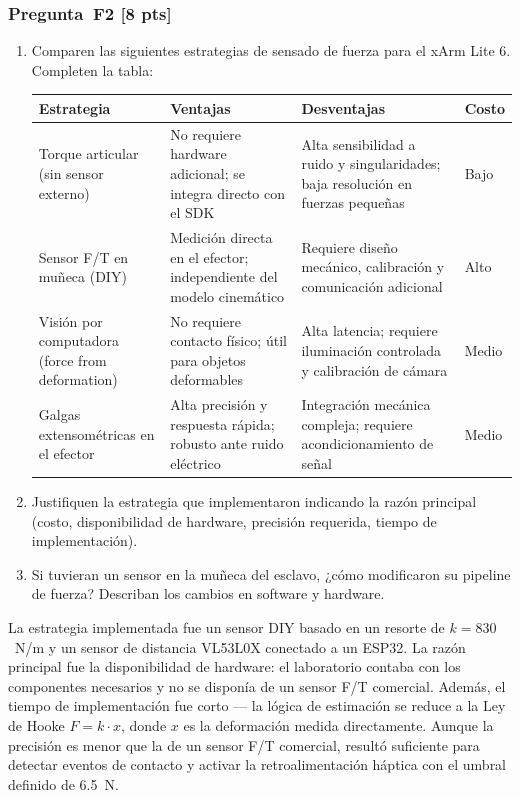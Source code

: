 \documentclass[journal,10pt,twoside]{IEEEtran}
\newcommand{\pts}[1]{\textbf{\color{tec_red}[#1 pts]}}
\begin{document}
\subsubsection*{Pregunta~F2 \pts{8}}
\begin{enumerate}[label=(\alph*)]
  \item Comparen las siguientes estrategias de sensado de fuerza
        para el xArm Lite 6. Completen la tabla:

\begin{center}
\small
\begin{tabular}{p{2.1cm}p{1.7cm}p{1.7cm}p{0.7cm}}
  \toprule
  \textbf{Estrategia} & \textbf{Ventajas} & \textbf{Desventajas} & \textbf{Costo} \\
  \midrule
  Torque articular (sin sensor externo)
    & No requiere hardware adicional; se integra directo con el SDK
    & Alta sensibilidad a ruido y singularidades; baja resolución en fuerzas pequeñas
    & Bajo \\
  Sensor F/T en muñeca (DIY)
    & Medición directa en el efector; independiente del modelo cinemático
    & Requiere diseño mecánico, calibración y comunicación adicional
    & Alto \\
  Visión por computadora (force from deformation)
    & No requiere contacto físico; útil para objetos deformables
    & Alta latencia; requiere iluminación controlada y calibración de cámara
    & Medio \\
  Galgas extensométricas en el efector
    & Alta precisión y respuesta rápida; robusto ante ruido eléctrico
    & Integración mecánica compleja; requiere acondicionamiento de señal
    & Medio \\
  \bottomrule
\end{tabular}
\end{center}

  \item Justifiquen la estrategia que implementaron indicando
        la razón principal (costo, disponibilidad de hardware,
        precisión requerida, tiempo de implementación).
  \item Si tuvieran un sensor en la muñeca del
        esclavo, ¿cómo modificaron su pipeline de fuerza?
        Describan los cambios en software y hardware.
\end{enumerate}

La estrategia implementada fue un sensor DIY basado 
en un resorte de $k = 830$~N/m y un sensor de distancia VL53L0X 
conectado a un ESP32. La razón principal fue la disponibilidad de 
hardware: el laboratorio contaba con los componentes necesarios y 
no se disponía de un sensor F/T comercial. Además, el tiempo de 
implementación fue corto — la lógica de estimación se reduce a la 
Ley de Hooke $F = k \cdot x$, donde $x$ es la deformación medida 
directamente. Aunque la precisión es menor que la de un sensor F/T 
comercial, resultó suficiente para detectar eventos de contacto y 
activar la retroalimentación háptica con el umbral definido de 
6.5~N.
\end{document}
